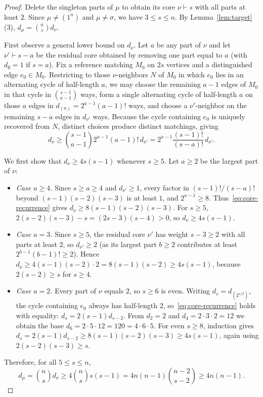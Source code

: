 \documentclass[11pt]{article}
\theoremstyle{remark}
\begin{document}
\begin{proof}
Delete the singleton parts of $\mu$ to obtain its core $\nu \vdash s$ with all
parts at least $2$. Since $\mu \neq (1^n)$ and $\mu \neq \sigma$, we have
$3 \le s \le n$. By Lemma~\ref{lem:target}(3), $d_\mu = \binom{n}{s} d_\nu$.

First observe a general lower bound on $d_\nu$. Let $a$ be any part of $\nu$
and let $\nu' \vdash s - a$ be the residual core obtained by removing one part
equal to $a$ (with $d_\emptyset = 1$ if $s = a$). Fix a reference matching
$M_0$ on $2s$ vertices and a distinguished edge $e_0 \in M_0$. Restricting to
those $\nu$-neighbors $N$ of $M_0$ in which $e_0$ lies in an alternating cycle
of half-length $a$, we may choose the remaining $a - 1$ edges of $M_0$ in that
cycle in $\binom{s-1}{a-1}$ ways, form a single alternating cycle of
half-length $a$ on those $a$ edges in $d_{(a)} = 2^{a-1}(a-1)!$ ways, and
choose a $\nu'$-neighbor on the remaining $s - a$ edges in $d_{\nu'}$ ways.
Because the cycle containing $e_0$ is uniquely recovered from $N$, distinct
choices produce distinct matchings, giving
\begin{equation}\label{eq:core-recurrence}
  d_\nu \ge \binom{s-1}{a-1} 2^{a-1}(a-1)!\, d_{\nu'}
  = 2^{a-1} \frac{(s-1)!}{(s-a)!}\, d_{\nu'}.
\end{equation}

We first show that $d_\nu \ge 4 s(s-1)$ whenever $s \ge 5$. Let $a \ge 2$ be
the largest part of $\nu$:
\begin{itemize}
  \item \emph{Case $a \ge 4$.} Since $s \ge a \ge 4$ and $d_{\nu'} \ge 1$,
  every factor in $(s-1)!/(s-a)!$ beyond $(s-1)(s-2)(s-3)$ is at least $1$, and
  $2^{a-1} \ge 8$. Thus~\eqref{eq:core-recurrence} gives
  $d_\nu \ge 8(s-1)(s-2)(s-3)$. For $s \ge 5$,
  $2(s-2)(s-3) - s = (2s-3)(s-4) > 0$, so $d_\nu \ge 4s(s-1)$.
  \item \emph{Case $a = 3$.} Since $s \ge 5$, the residual core $\nu'$ has
  weight $s - 3 \ge 2$ with all parts at least $2$, so $d_{\nu'} \ge 2$ (as its
  largest part $b \ge 2$ contributes at least $2^{b-1}(b-1)! \ge 2$). Hence
  $d_\nu \ge 4(s-1)(s-2) \cdot 2 = 8(s-1)(s-2) \ge 4s(s-1)$, because
  $2(s-2) \ge s$ for $s \ge 4$.
  \item \emph{Case $a = 2$.} Every part of $\nu$ equals $2$, so $s \ge 6$ is
  even. Writing $d_s = d_{(2^{s/2})}$, the cycle containing $e_0$ always has
  half-length $2$, so~\eqref{eq:core-recurrence} holds with equality:
  $d_s = 2(s-1) d_{s-2}$. From $d_2 = 2$ and $d_4 = 2 \cdot 3 \cdot 2 = 12$ we
  obtain the base $d_6 = 2 \cdot 5 \cdot 12 = 120 = 4 \cdot 6 \cdot 5$. For
  even $s \ge 8$, induction gives
  $d_s = 2(s-1) d_{s-2} \ge 8(s-1)(s-2)(s-3) \ge 4s(s-1)$, again using
  $2(s-2)(s-3) \ge s$.
\end{itemize}
Therefore, for all $5 \le s \le n$,
\[
  d_\mu = \binom{n}{s} d_\nu
  \ge 4 \binom{n}{s} s(s-1)
  = 4 n(n-1) \binom{n-2}{s-2}
  \ge 4 n(n-1).
\]


\end{proof}
\end{document}

